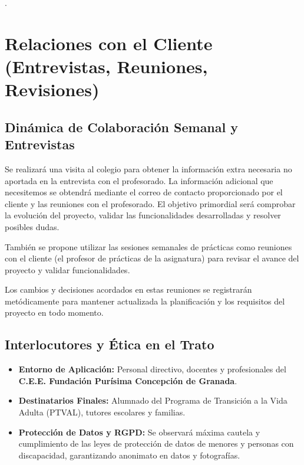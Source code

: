 \newpage
.\section{Relaciones con el Cliente (Entrevistas, Reuniones, Revisiones)}

\subsection{Dinámica de Colaboración Semanal y Entrevistas}
Se realizará una visita al colegio para obtener la información extra necesaria no aportada en la entrevista con el profesorado. La información adicional que necesitemos se obtendrá mediante el correo de contacto proporcionado por el cliente y las reuniones con el profesorado. El objetivo primordial será comprobar la evolución del proyecto, validar las funcionalidades desarrolladas y resolver posibles dudas.  

También se propone utilizar las sesiones semanales de prácticas como reuniones con el cliente (el profesor de prácticas de la asignatura) para revisar el avance del proyecto y validar funcionalidades.

Los cambios y decisiones acordados en estas reuniones se registrarán metódicamente para mantener actualizada la planificación y los requisitos del proyecto en todo momento.

\subsection{Interlocutores y Ética en el Trato}
\begin{itemize}[leftmargin=*]
  \item \textbf{Entorno de Aplicación:} Personal directivo, docentes y profesionales del \textbf{C.E.E. Fundación Purísima Concepción de Granada}.
  \item \textbf{Destinatarios Finales:} Alumnado del Programa de Transición a la Vida Adulta (PTVAL), tutores escolares y familias.
  \item \textbf{Protección de Datos y RGPD:} Se observará máxima cautela y cumplimiento de las leyes de protección de datos de menores y personas con discapacidad, garantizando anonimato en datos y fotografías.
\end{itemize}
